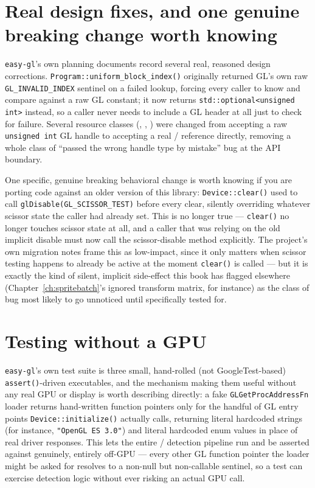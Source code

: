 \section{Real design fixes, and one genuine breaking change worth knowing}

\texttt{easy-gl}'s own planning documents record several real, reasoned design corrections.
\texttt{Program::uniform\_block\_index()} originally returned GL's own raw
\texttt{GL\_INVALID\_INDEX} sentinel on a failed lookup, forcing every caller to know and
compare against a raw GL constant; it now returns \texttt{std::optional<unsigned int>}
instead, so a caller never needs to include a GL header at all just to check for failure.
Several resource classes (, ,
) were changed from accepting a raw \texttt{unsigned int} GL
handle to accepting a real / reference directly, removing
a whole class of ``passed the wrong handle type by mistake'' bug at the API boundary.

One specific, genuine breaking behavioral change is worth knowing if you are porting code
against an older version of this library: \texttt{Device::clear()} used to call
\texttt{glDisable(GL\_SCISSOR\_TEST)} before every clear, silently overriding whatever scissor
state the caller had already set. This is no longer true --- \texttt{clear()} no longer
touches scissor state at all, and a caller that was relying on the old implicit disable must
now call the scissor-disable method explicitly. The project's own migration notes frame this
as low-impact, since it only matters when scissor testing happens to already be active at the
moment \texttt{clear()} is called --- but it is exactly the kind of silent, implicit
side-effect this book has flagged elsewhere (Chapter~\ref{ch:spritebatch}'s ignored transform
matrix, for instance) as the class of bug most likely to go unnoticed until specifically
tested for.

\section{Testing without a GPU}

\texttt{easy-gl}'s own test suite is three small, hand-rolled (not GoogleTest-based)
\texttt{assert()}-driven executables, and the mechanism making them useful without any real
GPU or display is worth describing directly: a fake \texttt{GLGetProcAddressFn} loader
returns hand-written function pointers only for the handful of GL entry points
\texttt{Device::initialize()} actually calls, returning literal hardcoded strings (for
instance, \texttt{"OpenGL ES 3.0"}) and literal hardcoded enum values in place of real driver
responses. This lets the entire / detection
pipeline run and be asserted against genuinely, entirely off-GPU --- every other GL function
pointer the loader might be asked for resolves to a non-null but non-callable sentinel, so a
test can exercise detection logic without ever risking an actual GPU call.

